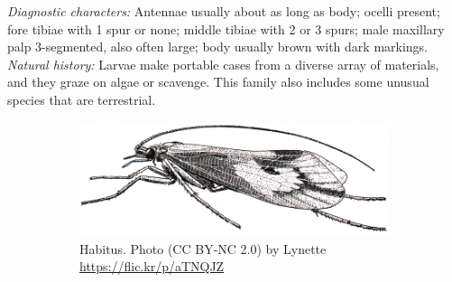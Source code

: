 \documentclass[letterpaper, 11pt]{article}
\begin{document}
\noindent{}\textit{Diagnostic characters:} Antennae usually about as long as body; ocelli present; fore tibiae with 1 spur or none; middle tibiae with 2 or 3 spurs; male maxillary palp 3-segmented, also often large; body usually brown with dark markings.\\ 

\noindent{}\textit{Natural history:} Larvae make portable cases from a diverse array of materials, and they graze on algae or scavenge. This family also includes some unusual species that are terrestrial.

\begin{figure}[ht!]
    \centering
    \begin{subfigure}[ht!]{0.68\textwidth}
        \includegraphics[width=\textwidth]{TrichoImage02}
        \caption{Habitus. Photo (CC BY-NC 2.0) by Lynette \url{https://flic.kr/p/aTNQJZ}}
        \label{fig:limnephilid1}
    \end{subfigure}
    \hfill %
    \begin{subfigure}[ht!]{0.15\textwidth}

\end{subfigure}
\end{figure}
\end{document}
